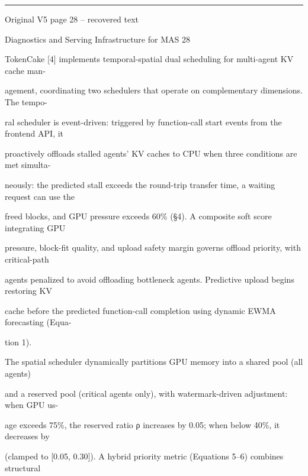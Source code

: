 \par\smallskip\noindent\rule{\textwidth}{0.4pt}\par{\sffamily\footnotesize Original V5 page 28 -- recovered text}\par\begin{flushleft}\footnotesize\ttfamily
\par\smallskip
\par\smallskip
\noindent Diagnostics and Serving Infrastructure for MAS 28\par
\par\smallskip
\par\smallskip
\par\smallskip
\noindent  TokenCake [4] implements temporal-spatial dual scheduling for multi-agent KV cache man-\par
\noindent agement, coordinating two schedulers that operate on complementary dimensions. The tempo-\par
\noindent ral scheduler is event-driven: triggered by function-call start events from the frontend API, it\par
\noindent proactively offloads stalled agents’ KV caches to CPU when three conditions are met simulta-\par
\noindent neously: the predicted stall exceeds the round-trip transfer time, a waiting request can use the\par
\noindent freed blocks, and GPU pressure exceeds 60\% (§4). A composite soft score integrating GPU\par
\noindent pressure, block-fit quality, and upload safety margin governs offload priority, with critical-path\par
\noindent agents penalized to avoid offloading bottleneck agents. Predictive upload begins restoring KV\par
\noindent cache before the predicted function-call completion using dynamic EWMA forecasting (Equa-\par
\noindent tion 1).\par
\noindent  The spatial scheduler dynamically partitions GPU memory into a shared pool (all agents)\par
\noindent and a reserved pool (critical agents only), with watermark-driven adjustment: when GPU us-\par
\noindent age exceeds 75\%, the reserved ratio ρ increases by 0.05; when below 40\%, it decreases by\par
{} (clamped to [0.05, 0.30]). A hybrid priority metric (Equations 5–6) combines structural\par

\end{flushleft}
